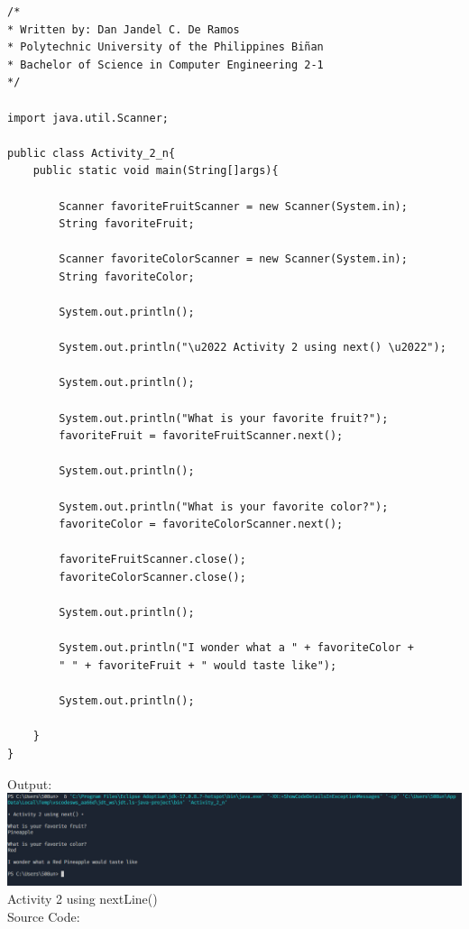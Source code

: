 \documentclass[12pt]{article}
\begin{document}
	\begin{verbatim}         
/*
* Written by: Dan Jandel C. De Ramos
* Polytechnic University of the Philippines Biñan
* Bachelor of Science in Computer Engineering 2-1
*/

import java.util.Scanner;

public class Activity_2_n{
	public static void main(String[]args){
		
		Scanner favoriteFruitScanner = new Scanner(System.in);
		String favoriteFruit;
		
		Scanner favoriteColorScanner = new Scanner(System.in);
		String favoriteColor;
		
		System.out.println();
		
		System.out.println("\u2022 Activity 2 using next() \u2022");
		
		System.out.println();
		
		System.out.println("What is your favorite fruit?");
		favoriteFruit = favoriteFruitScanner.next();    
		
		System.out.println();
		
		System.out.println("What is your favorite color?");
		favoriteColor = favoriteColorScanner.next();
		
		favoriteFruitScanner.close();
		favoriteColorScanner.close();
		
		System.out.println();        
		
		System.out.println("I wonder what a " + favoriteColor +
		" " + favoriteFruit + " would taste like");
		
		System.out.println();
		
	}
}
	\end{verbatim}
	\clearpage
	\noindent
	Output:\\
	\includegraphics[width=\textwidth]{output2n}	
	\clearpage
	\noindent
	Activity 2 using nextLine()\\
	Source Code:
\end{document}
